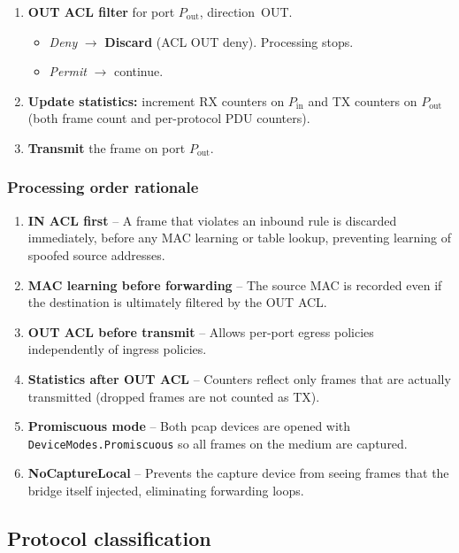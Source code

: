 \documentclass[12pt,a4paper]{article}
\begin{document}
\begin{enumerate}
  \item \textbf{OUT ACL filter} for port $P_{\mathrm{out}}$, direction~OUT.
    \begin{itemize}[noitemsep]
      \item \emph{Deny} $\to$ \textbf{Discard} (ACL OUT deny). Processing
            stops.
      \item \emph{Permit} $\to$ continue.
    \end{itemize}

  \item \textbf{Update statistics:} increment RX counters on
        $P_{\mathrm{in}}$ and TX counters on $P_{\mathrm{out}}$ (both
        frame count and per-protocol PDU counters).

  \item \textbf{Transmit} the frame on port $P_{\mathrm{out}}$.
\end{enumerate}

\subsubsection{Processing order rationale}

\begin{enumerate}[noitemsep]
  \item \textbf{IN ACL first} -- A frame that violates an inbound rule is
    discarded immediately, before any MAC learning or table lookup, preventing
    learning of spoofed source addresses.
  \item \textbf{MAC learning before forwarding} -- The source MAC is recorded
    even if the destination is ultimately filtered by the OUT ACL.
  \item \textbf{OUT ACL before transmit} -- Allows per-port egress policies
    independently of ingress policies.
  \item \textbf{Statistics after OUT ACL} -- Counters reflect only frames that
    are actually transmitted (dropped frames are not counted as TX).
  \item \textbf{Promiscuous mode} -- Both pcap devices are opened with
    \texttt{DeviceModes.Promiscuous} so all frames on the medium are captured.
  \item \textbf{NoCaptureLocal} -- Prevents the capture device from seeing
    frames that the bridge itself injected, eliminating forwarding loops.
\end{enumerate}

\subsection{Protocol classification}
\label{sec:detection}
\end{document}
